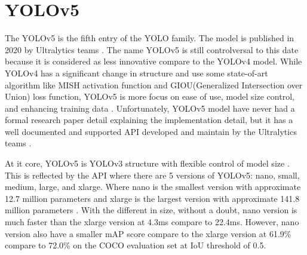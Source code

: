 \section{YOLOv5}  \label{sec:yolov5}

The YOLOv5 is the fifth entry of the YOLO family. The model is published in 2020 by Ultralytics teams \cite{yolov5_github}. The name YOLOv5 is still controlversal to this date because it is considered as less innovative compare to the YOLOv4 model. While YOLOv4 has a significant change in structure and use some state-of-art algorithm like MISH activation function and GIOU(Generalized Intersection over Union) loss function, YOLOv5 is more focus on ease of use, model size control, and enhancing training data \cite{yolov5_review}. Unfortunately, YOLOv5 model have never had a formal research paper detail explaining the implementation detail, but it has a well documented and supported API developed and maintain by the Ultralytics teams \cite{yolov5_github}. 

At it core, YOLOv5 is YOLOv3 structure with flexible control of model size \cite{yolov5_review}. This is reflected by the API where there are 5 versions of YOLOv5: nano, small, medium, large, and xlarge. Where nano is the smallest version with approximate 12.7 million parameters and xlarge is the largest version with approximate 141.8 million parameters \cite{pytorch_yolov5}. With the different in size, without a doubt, nano version is much faster than the xlarge version at 4.3ms compare to 22.4ms. However, nano version also have a smaller mAP score compare to the xlarge version at 61.9\% compare to 72.0\% on the COCO evaluation set at IoU threshold of 0.5.